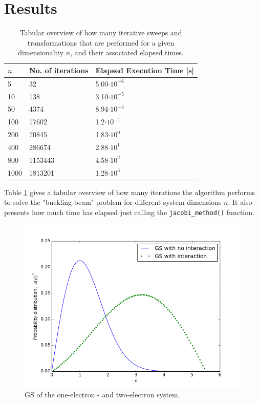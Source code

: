 	\section{Results}
	\begin{table}[h!]
		\centering
		\caption{Tabular overview of how many iterative sweeps and transformations that are performed for a given dimensionality $n$, and their associated elapsed times.}
		\label{tab1}
		\begin{tabular}{l|l|l}
			$n$ & No. of iterations & Elapsed Execution Time [s]\\
			\hline
			5 & 32 & 5.00$\cdot10^{-6}$\\
			10 & 138 & 3.10$\cdot10^{-5}$\\
			50 & 4374 & 8.94$\cdot10^{-3}$\\
			100 & 17602 & 1.2$\cdot10^{-1}$\\
			200 & 70845 & 1.83$\cdot10^0$\\
			400 & 286674 & 2.88$\cdot10^1$\\
			800 & 1153443 & 4.58$\cdot10^2$ \\
			1000 & 1813201 & 1.28$\cdot10^3$ \\
		\end{tabular}
	\end{table}
	Table \ref{tab1} gives a tabular overview of how many iterations the algorithm performs to solve the "buckling beam" problem for different system dimensions $n$. It also presents how much time has elapsed just calling the \texttt{jacobi\_method()} function.
	\begin{figure}[H]
	\includegraphics[width=\linewidth]{groundstates1.png}
	\caption{GS of the one-electron - and two-electron system.}
	\label{gs1}
	\end{figure}

